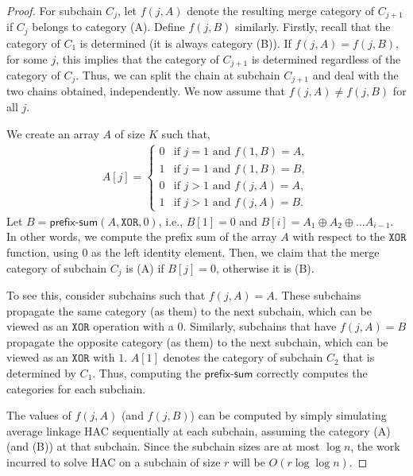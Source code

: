 \begin{proof}
    For subchain $C_j$, let $f(j,A)$ denote the resulting merge category of $C_{j+1}$ if $C_j$ belongs to category (A). Define $f(j,B)$ similarly. Firstly, recall that the category of $C_1$ is determined (it is always category (B)). 
    If $f(j,A) = f(j,B)$, for some $j$, this implies that the category of $C_{j+1}$ is determined regardless of the category of $C_j$. Thus, we can split the chain at subchain $C_{j+1}$ and deal with the two chains obtained, independently. We now assume that $f(j,A)\ne f(j,B)$ for all $j$.

    We create an array $A$ of size $K$ such that,
    \begin{align*}
        A[j] = \begin{cases}
            0 & \text{if $j=1$ and $f(1,B)=A$},\\
            1 & \text{if $j=1$ and $f(1,B)=B$},\\
            0 & \text{if $j>1$ and $f(j,A)=A$},\\
            1 & \text{if $j>1$ and $f(j,A)=B$}.
        \end{cases} 
    \end{align*}
    Let $B= \mathsf{prefix\text{-}sum}(A,\mathtt{XOR},0)$, i.e., $B[1]=0$ and $B[i]=A_1\oplus A_2 \oplus\ldots A_{i-1}$.
    In other words, we compute the prefix sum of the array $A$ with respect to the $\mathtt{XOR}$ function, using $0$ as the left identity element.
    Then, we claim that the merge category of subchain $C_j$ is (A) if $B[j]=0$, otherwise it is (B).

    To see this, consider subchains such that $f(j,A)=A$. These subchains propagate the same category (as them) to the next subchain, which can be viewed as an $\mathtt{XOR}$ operation with a $0$. Similarly, subchains that have $f(j,A)=B$ propagate the opposite category (as them) to the next subchain, which can be viewed as an $\mathtt{XOR}$ with $1$. $A[1]$ denotes the category of subchain $C_2$ that is determined by $C_1$. Thus, computing the $\mathsf{prefix\text{-}sum}$ correctly computes the categories for each subchain.

    The values of $f(j,A)$ (and $f(j,B)$) can be computed by simply simulating average linkage HAC sequentially at each subchain, assuming the category (A) (and (B)) at that subchain. 
    Since the subchain sizes are at most $\log n$, the work incurred to solve HAC on a subchain of size $r$ will be $O(r\log\log n)$.
    

\end{proof}
